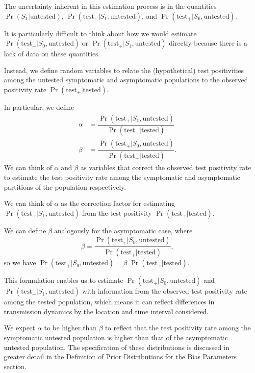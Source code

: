\documentclass[12pt,twoside]{smiththesis}
\begin{document}
The uncertainty inherent in this estimation process is in the quantities \(\Pr(S_1|\text{untested})\), \(\Pr(\text{test}_+| S_1,\text{untested})\), and \(\Pr(\text{test}_+ | S_0,\text{untested})\).

It is particularly difficult to think about how we would estimate \(\Pr(\text{test}_+ | S_0,\text{untested})\) or \(\Pr(\text{test}_+ | S_1,\text{untested})\) directly because there is a lack of data on these quantities.

Instead, we define random variables to relate the (hypothetical) test positivities among the untested symptomatic and asymptomatic populations to the observed positivity rate \(\Pr(\text{test}_+|\text{tested})\).

In particular, we define
\begin{align*}
\alpha &= \dfrac{\Pr(\text{test}_+  |S_1, \text{untested})}{\Pr(\text{test}_+ | \text{tested})}\\
\beta  &= \dfrac{\Pr(\text{test}_+ |S_0, \text{untested})}{\Pr(\text{test}_+ | \text{tested})}.
\end{align*}
We can think of \(\alpha\) and \(\beta\) as variables that correct the observed test positivity rate to estimate the test positivity rate among the symptomatic and asymptomatic partitions of the population respectively.

We can think of \(\alpha\) as the correction factor for estimating \(\Pr(\text{test}_+|S_1,\text{untested})\) from the test positivity \(\Pr(\text{test}_+ |\text{tested})\).

We can define \(\beta\) analogously for the asymptomatic case, where
\[\beta =  \dfrac{\Pr(\text{test}_+ |S_0, \text{untested})}{\Pr(\text{test}_+ | \text{tested})},\]
so we have \(\Pr(\text{test}_+ |S_0, \text{untested}) = \beta \; \Pr(\text{test}_+ | \text{tested})\).

This formulation enables us to estimate \(\Pr(\text{test}_+ |S_0, \text{untested})\) and \(\Pr(\text{test}_+ |S_1, \text{untested})\) with information from the observed test positivity rate among the tested population, which means it can reflect differences in transmission dynamics by the location and time interval considered.

We expect \(\alpha\) to be higher than \(\beta\) to reflect that the test positivity rate among the symptomatic untested population is higher than that of the asymptomatic untested population. The specification of these distributions is discussed in greater detail in the \protect\hyperlink{defpriors}{Definition of Prior Distributions for the Bias Parameters} section.
\end{document}
